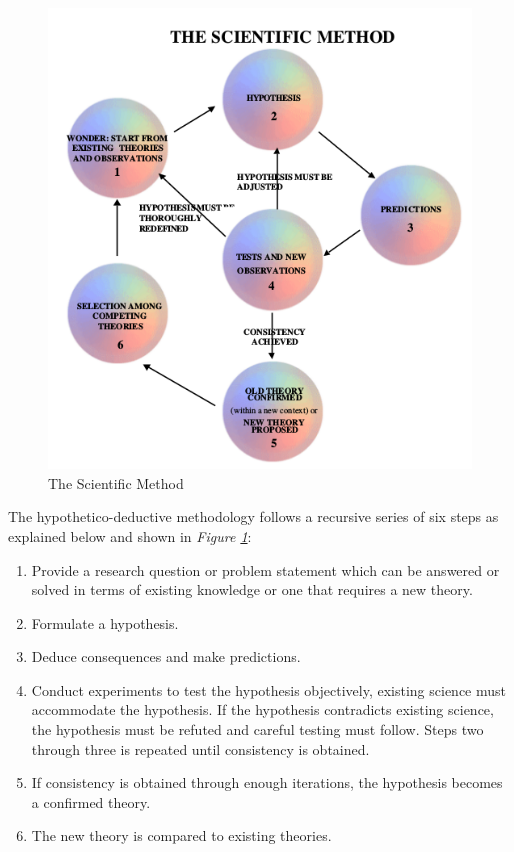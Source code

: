 \documentclass[11pt]{article}
\begin{document}
			\begin{figure}[h]
				\centering
				\includegraphics[scale=0.5]{scientific_method.png}
				\caption{The Scientific Method \textsc{\protect\cite{dodig2002scientific}}} %
				\label{scientificmethod} %
			\end{figure}

			The hypothetico-deductive methodology follows a recursive series of six steps as explained below and shown in \textit{Figure \ref{scientificmethod}}:
			\begin{enumerate}
				\item Provide a research question or problem statement which can be answered or solved in terms of existing knowledge or one that requires a new theory.
				\item Formulate a hypothesis.
				\item Deduce consequences and make predictions.
				\item Conduct experiments to test the hypothesis objectively, existing science must accommodate the hypothesis. If the hypothesis contradicts existing science, the hypothesis must be refuted and careful testing must follow. Steps two through three is repeated until consistency is obtained.
				\item If consistency is obtained through enough iterations, the hypothesis becomes a confirmed theory.
				\item The new theory is compared to existing theories.
			\end{enumerate}%
\end{document}
